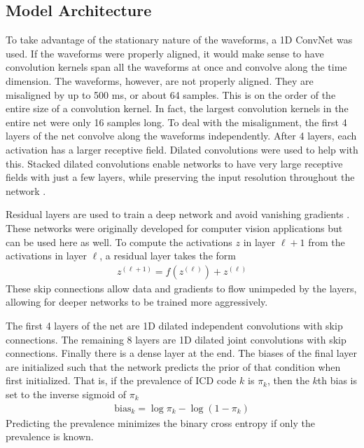 \subsection{Model Architecture}

To take advantage of the stationary nature of the waveforms, a 1D ConvNet was used.  If the waveforms were properly aligned, it would make sense to have convolution kernels span all the waveforms at once and convolve along the time dimension.  The waveforms, however, are not properly aligned.  They are misaligned by up to 500 ms, or about 64 samples.  This is on the order of the entire size of a convolution kernel.  In fact, the largest convolution kernels in the entire net were only 16 samples long.  To deal with the misalignment, the first 4 layers of the net convolve along the waveforms independently.  After 4 layers, each activation has a larger receptive field.  Dilated convolutions were used to help with this.  Stacked dilated convolutions enable networks to have very large receptive fields with just a few layers, while preserving the input resolution throughout the network \cite{oord2016wavenet}.  

Residual layers are used to train a deep network and avoid vanishing gradients \cite{he2016deep}.  These networks were originally developed for computer vision applications but can be used here as well.  To compute the activations $z$ in layer $\ell + 1$ from the activations in layer $\ell$, a residual layer takes the form
\begin{gather}
    z^{(\ell + 1)} = f(z^{(\ell)}) + z^{(\ell)}
\end{gather}
These skip connections allow data and gradients to flow unimpeded by the layers, allowing for deeper networks to be trained more aggressively.

The first 4 layers of the net are 1D dilated independent convolutions with skip connections.  The remaining 8 layers are 1D dilated joint convolutions with skip connections.  Finally there is a dense layer at the end.  The biases of the final layer are initialized such that the network predicts the prior of that condition when first initialized.  That is, if the prevalence of ICD code $k$ is $\pi_k$, then the $k$th bias is set to the inverse sigmoid of $\pi_k$
\begin{gather}
    \text{bias}_k = \log \pi_k - \log(1 - \pi_k)
\end{gather}
Predicting the prevalence minimizes the binary cross entropy if only the prevalence is known.

